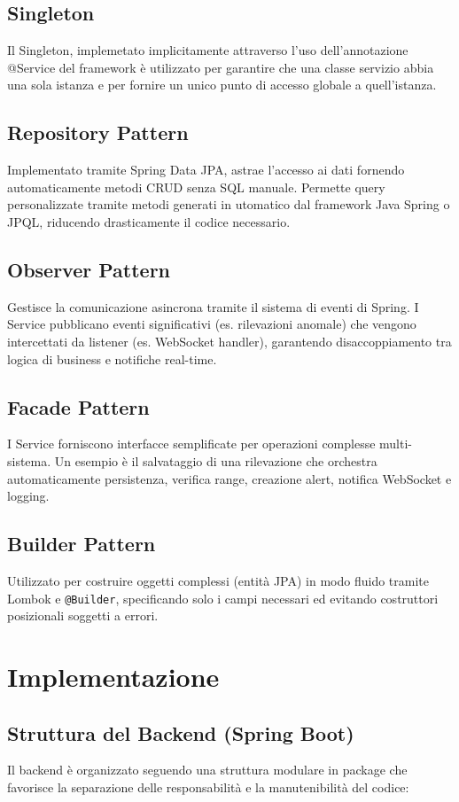 \documentclass{report}
\begin{document}
\subsection{Singleton}
Il Singleton, implemetato implicitamente attraverso l'uso dell'annotazione @Service del framework  è utilizzato per garantire che una classe servizio abbia una sola istanza e per fornire un unico punto di accesso globale a quell'istanza.

\subsection{Repository Pattern}
Implementato tramite Spring Data JPA, astrae l'accesso ai dati fornendo automaticamente metodi CRUD senza SQL 
manuale. Permette query personalizzate tramite metodi generati in utomatico dal framework Java Spring o JPQL, riducendo drasticamente il codice necessario.

\subsection{Observer Pattern}
Gestisce la comunicazione asincrona tramite il sistema di eventi di Spring. I Service pubblicano eventi 
significativi (es. rilevazioni anomale) che vengono intercettati da listener (es. WebSocket handler), garantendo 
disaccoppiamento tra logica di business e notifiche real-time.

\subsection{Facade Pattern}
I Service forniscono interfacce semplificate per operazioni complesse multi-sistema. Un esempio è il salvataggio 
di una rilevazione che orchestra automaticamente persistenza, verifica range, creazione alert, notifica WebSocket 
e logging.

\subsection{Builder Pattern}
Utilizzato per costruire oggetti complessi (entità JPA) in modo fluido tramite Lombok e \texttt{@Builder}, 
specificando solo i campi necessari ed evitando costruttori posizionali soggetti a errori.

\section{Implementazione}
\subsection{Struttura del Backend (Spring Boot)}
Il backend è organizzato seguendo una struttura modulare in package che favorisce 
la separazione delle responsabilità e la manutenibilità del codice:
\end{document}
